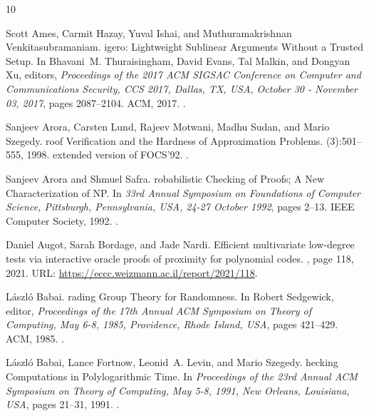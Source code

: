 \documentclass[10pt,a4paper]{article}
\theoremstyle{plain}
\theoremstyle{plain}
\theoremstyle{definition}
\theoremstyle{remark}
\theoremstyle{plain}
\begin{document}
\begin{thebibliography}{10}

Scott Ames, Carmit Hazay, Yuval Ishai, and Muthuramakrishnan
  Venkitasubramaniam.
igero: {L}ightweight {S}ublinear {A}rguments {W}ithout a {T}rusted
  {S}etup.
\newblock In Bhavani~M. Thuraisingham, David Evans, Tal Malkin, and Dongyan Xu,
  editors, {\em Proceedings of the 2017 {ACM} {SIGSAC} Conference on Computer
  and Communications Security, {CCS} 2017, Dallas, TX, USA, October 30 -
  November 03, 2017}, pages 2087--2104. {ACM}, 2017.
\newblock \href {https://doi.org/10.1145/3133956.3134104}
  {}.

Sanjeev Arora, Carsten Lund, Rajeev Motwani, Madhu Sudan, and Mario Szegedy.
roof {V}erification and the {H}ardness of {A}pproximation
  {P}roblems.
(3):501--555, 1998.
\newblock extended version of FOCS'92.
\newblock \href {https://doi.org/10.1145/278298.278306}
  {}.

Sanjeev Arora and Shmuel Safra.
robabilistic {C}hecking of {P}roofs; {{A}} {N}ew
  {C}haracterization of {{N}{P}}.
\newblock In {\em 33rd Annual Symposium on Foundations of Computer Science,
  Pittsburgh, Pennsylvania, USA, 24-27 October 1992}, pages 2--13. {IEEE}
  Computer Society, 1992.
\newblock \href {https://doi.org/10.1145/273865.273901}
  {}.

Daniel Augot, Sarah Bordage, and Jade Nardi.
\newblock Efficient multivariate low-degree tests via interactive oracle proofs
  of proximity for polynomial codes.
, page 118, 2021.
\newblock URL: \url{https://eccc.weizmann.ac.il/report/2021/118}.

L{\'{a}}szl{\'{o}} Babai.
rading {G}roup {T}heory for {R}andomness.
\newblock In Robert Sedgewick, editor, {\em Proceedings of the 17th Annual
  {ACM} Symposium on Theory of Computing, May 6-8, 1985, Providence, Rhode
  Island, {USA}}, pages 421--429. {ACM}, 1985.
\newblock \href {https://doi.org/10.1145/22145.22192}
  {}.

L{\'{a}}szl{\'{o}} Babai, Lance Fortnow, Leonid~A. Levin, and Mario Szegedy.
hecking {C}omputations in {P}olylogarithmic {T}ime.
\newblock In {\em Proceedings of the 23rd Annual {ACM} Symposium on Theory of
  Computing, May 5-8, 1991, New Orleans, Louisiana, {USA}}, pages 21--31, 1991.
\newblock \href {https://doi.org/10.1145/103418.103428}
  {}.


\end{thebibliography}
\end{document}
